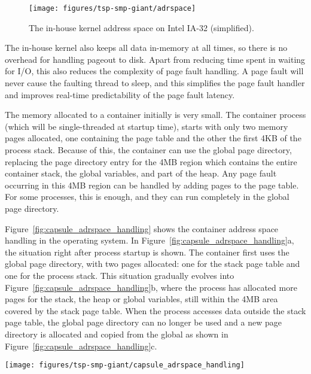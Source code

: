 \begin{figure}[thb]
  \centering
  \texttt{[image: figures/tsp-smp-giant/adrspace]}
  \caption[Address space on IA-32]{The in-house kernel address space on Intel IA-32 (simplified).}
  \label{fig:adrspace}
\end{figure}

The in-house kernel also keeps all data in-memory at all times, so there is no
overhead for handling pageout to disk. Apart from reducing time spent in
waiting for I/O, this also reduces the complexity of page fault handling. A
page fault will never cause the faulting thread to sleep, and this simplifies
the page fault handler and improves real-time predictability of the page fault
latency.

The memory allocated to a container initially is very small. The container process
(which will be single-threaded at startup time), starts with only two memory
pages allocated, one containing the page table and the other the first 4KB of
the process stack. Because of this, the container can use the global page
directory, replacing the page directory entry for the 4MB region which
contains the entire container stack, the global variables, and part of the heap.
Any page fault occurring in this 4MB region can be handled by adding pages to
the page table. For some processes, this is enough, and they can run
completely in the global page directory.

Figure~\ref{fig:capsule_adrspace_handling} shows the container address space
handling in the operating system. In
Figure~\ref{fig:capsule_adrspace_handling}a, the situation right after process
startup is shown. The container first uses the global page directory, with two
pages allocated: one for the stack page table and one for the process stack.
This situation gradually evolves into
Figure~\ref{fig:capsule_adrspace_handling}b, where the process has allocated
more pages for the stack, the heap or global variables, still within the 4MB
area covered by the stack page table. When the process accesses data outside
the stack page table, the global page directory can no longer be used and a
new page directory is allocated and copied from the global as shown in
Figure~\ref{fig:capsule_adrspace_handling}c.

\begin{figure*}[thb]
  \centering
  \texttt{[image: figures/tsp-smp-giant/capsule\_adrspace\_handling]}
  \caption[Container address space handling]{Handling of container address spaces in the in-house kernel}
  \label{fig:capsule_adrspace_handling}
\end{figure*}

